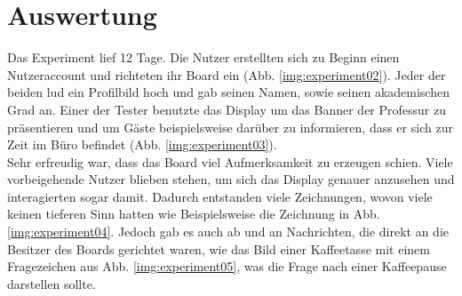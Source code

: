 \section{Auswertung}\label{Auswertung}
Das Experiment lief 12 Tage. Die Nutzer erstellten sich zu Beginn einen Nutzeraccount und richteten ihr Board ein (Abb. \ref{img:experiment02}). Jeder der beiden lud ein Profilbild hoch und gab seinen Namen, sowie seinen akademischen Grad an.
Einer der Tester benutzte das Display um das Banner der Professur zu präsentieren und um Gäste beispielsweise darüber zu informieren, dass er sich zur Zeit im Büro befindet (Abb. \ref{img:experiment03}).\\
Sehr erfreudig war, dass das Board viel Aufmerksamkeit zu erzeugen schien. Viele vorbeigehende Nutzer blieben stehen, um sich das Display genauer anzusehen und interagierten sogar damit. Dadurch entstanden viele Zeichnungen, wovon viele keinen tieferen Sinn hatten wie Beispielsweise die Zeichnung in Abb. \ref{img:experiment04}. Jedoch gab es auch ab und an Nachrichten, die direkt an die Besitzer des Boards gerichtet waren, wie das Bild einer Kaffeetasse mit einem Fragezeichen aus Abb. \ref{img:experiment05}, was die Frage nach einer Kaffeepause darstellen sollte.
